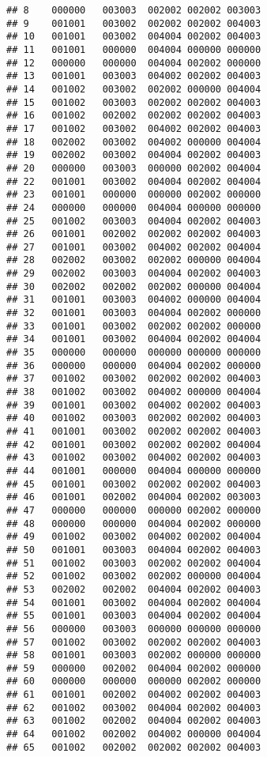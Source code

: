 \documentclass[
]{article}
\begin{document}
\begin{verbatim}
## 8    000000   003003  002002 002002 003003
## 9    001001   003002  002002 002002 004003
## 10   001001   003002  004004 002002 004003
## 11   001001   000000  004004 000000 000000
## 12   000000   000000  004004 002002 000000
## 13   001001   003003  004002 002002 004003
## 14   001002   003002  002002 000000 004004
## 15   001002   003003  002002 002002 004003
## 16   001002   002002  002002 002002 004003
## 17   001002   003002  004002 002002 004003
## 18   002002   003002  004002 000000 004004
## 19   002002   003002  004004 002002 004003
## 20   000000   003003  000000 002002 004004
## 22   001001   003002  004004 002002 004004
## 23   001001   000000  000000 002002 000000
## 24   000000   000000  004004 000000 000000
## 25   001002   003003  004004 002002 004003
## 26   001001   002002  002002 002002 004003
## 27   001001   003002  004002 002002 004004
## 28   002002   003002  002002 000000 004004
## 29   002002   003003  004004 002002 004003
## 30   002002   002002  002002 000000 004004
## 31   001001   003003  004002 000000 004004
## 32   001001   003003  004004 002002 000000
## 33   001001   003002  002002 002002 000000
## 34   001001   003002  004004 002002 004004
## 35   000000   000000  000000 000000 000000
## 36   000000   000000  004004 002002 000000
## 37   001002   003002  002002 002002 004003
## 38   001002   003002  004002 000000 004004
## 39   001001   003002  004002 002002 004003
## 40   001002   003003  002002 002002 004003
## 41   001001   003002  002002 002002 004003
## 42   001001   003002  002002 002002 004004
## 43   001002   003002  004002 002002 004003
## 44   001001   000000  004004 000000 000000
## 45   001001   003002  002002 002002 004003
## 46   001001   002002  004004 002002 003003
## 47   000000   000000  000000 002002 000000
## 48   000000   000000  004004 002002 000000
## 49   001002   003002  004002 002002 004004
## 50   001001   003003  004004 002002 004003
## 51   001002   003003  002002 002002 004004
## 52   001002   003002  002002 000000 004004
## 53   002002   002002  004004 002002 004003
## 54   001001   003002  004004 002002 004004
## 55   001001   003003  004004 002002 004004
## 56   000000   003003  000000 000000 000000
## 57   001002   003002  002002 002002 004003
## 58   001001   003003  002002 000000 000000
## 59   000000   002002  004004 002002 000000
## 60   000000   000000  000000 002002 000000
## 61   001001   002002  004002 002002 004003
## 62   001002   003002  004004 002002 004003
## 63   001002   002002  004004 002002 004003
## 64   001002   002002  004002 000000 004004
## 65   001002   002002  002002 002002 004003

\end{verbatim}
\end{document}
